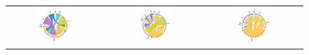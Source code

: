 \documentclass[a4paper]{article}
\begin{document}
\begin{figure}[h!]
{\begin{tabular}{ccc}
\includegraphics[width=0.4\textwidth, trim= {1.3cm 0.8cm 1.1cm 1cm}, clip]{"EORA_MIG_AGR_2010_19_ROW.pdf"} & \includegraphics[width=0.4\textwidth, trim= {1.3cm 0.8cm 1.1cm 1cm}, clip]{"EORA_MIG_FBE_2010_19_ROW.pdf"} &
\includegraphics[width=0.4\textwidth, trim= {1.3cm 0.8cm 1.1cm 1cm}, clip]{"EORA_MIG_MAN_2010_19_ROW.pdf"} \\
\end{tabular}
}
\end{figure}
\FloatBarrier
\end{document}

